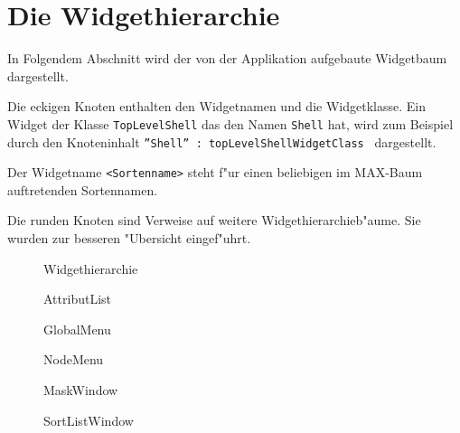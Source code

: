 
\section{Die Widgethierarchie}

In Folgendem Abschnitt wird der von der Applikation aufgebaute 
Widgetbaum dargestellt.

Die eckigen Knoten enthalten den Widgetnamen und die Widgetklasse.
Ein Widget der Klasse {\tt TopLevelShell} das den Namen {\tt Shell}
hat, wird zum Beispiel durch den Knoteninhalt
{\tt ''Shell'' : topLevelShellWidgetClass } dargestellt.

Der Widgetname {\tt <Sortenname>} steht f"ur einen beliebigen
im MAX-Baum auftretenden Sortennamen.

Die runden Knoten sind Verweise auf weitere Widgethierarchieb"aume.
Sie wurden zur besseren "Ubersicht eingef"uhrt.

\begin{figure}[h]
   \begin{center}
      \leavevmode
   \end{center}
   \caption{Widgethierarchie}
\end{figure}

\begin{figure}[h]
   \begin{center}
      \leavevmode
   \end{center}
   \caption{AttributList}
\end{figure}

\begin{figure}[h]
   \begin{center}
      \leavevmode
   \end{center}
   \caption{GlobalMenu}
\end{figure}

\begin{figure}[h]
   \begin{center}
      \leavevmode
   \end{center}
   \caption{NodeMenu}
\end{figure}

\begin{figure}[h]
   \begin{center}
      \leavevmode
   \end{center}
   \caption{MaskWindow}
\end{figure}

\begin{figure}[h]
   \begin{center}
      \leavevmode
   \end{center}
   \caption{SortListWindow}
\end{figure}

